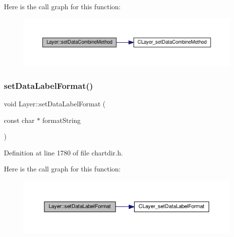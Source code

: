 Here is the call graph for this function\+:
\nopagebreak
\begin{figure}[H]
\begin{center}
\leavevmode
\includegraphics[width=350pt]{class_layer_a147a8f0cb1c34a9d778a285cbc2d5fba_cgraph}
\end{center}
\end{figure}
\mbox{\label{class_layer_a63ed05427073630b637d8b0643b36526}} 
\subsubsection{\texorpdfstring{set\+Data\+Label\+Format()}{setDataLabelFormat()}}
{\footnotesize\ttfamily void Layer\+::set\+Data\+Label\+Format (\begin{DoxyParamCaption}\item[{const char $\ast$}]{format\+String }\end{DoxyParamCaption})\hspace{0.3cm}{\ttfamily [inline]}}



Definition at line 1780 of file chartdir.\+h.

Here is the call graph for this function\+:
\nopagebreak
\begin{figure}[H]
\begin{center}
\leavevmode
\includegraphics[width=350pt]{class_layer_a63ed05427073630b637d8b0643b36526_cgraph}
\end{center}
\end{figure}
\mbox{\label{class_layer_ab9822ec131202c3959fa3235fb48746a}} 
